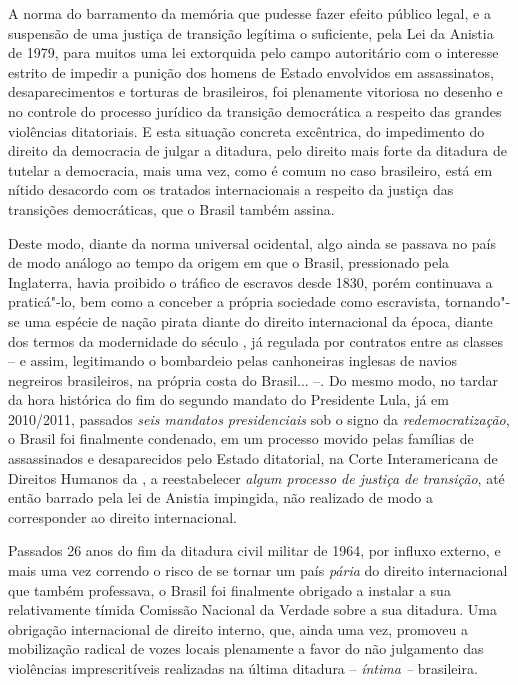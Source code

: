 A norma do barramento da memória que pudesse fazer efeito público legal,
e a suspensão de uma justiça de transição legítima o suficiente, pela
Lei da Anistia de 1979, para muitos uma lei extorquida pelo campo
autoritário com o interesse estrito de impedir a punição dos homens de
Estado envolvidos em assassinatos, desaparecimentos e torturas de
brasileiros, foi plenamente vitoriosa no desenho e no controle do
processo jurídico da transição democrática a respeito das grandes
violências ditatoriais. E esta situação concreta excêntrica, do
impedimento do direito da democracia de julgar a ditadura, pelo direito
mais forte da ditadura de tutelar a democracia, mais uma vez, como é
comum no caso brasileiro, está em nítido desacordo com os tratados
internacionais a respeito da justiça das transições democráticas, que o
Brasil também assina.

Deste modo, diante da norma universal ocidental, algo ainda se passava
no país de modo análogo ao tempo da origem em que o Brasil, pressionado
pela Inglaterra, havia proibido o tráfico de escravos desde 1830, porém
continuava a praticá"-lo, bem como a conceber a própria sociedade como
escravista, tornando"-se uma espécie de nação pirata diante do direito
internacional da época, diante dos termos da modernidade do século ,
já regulada por contratos entre as classes -- e assim, legitimando o
bombardeio pelas canhoneiras inglesas de navios negreiros brasileiros,
na própria costa do Brasil... --. Do mesmo modo, no tardar da hora
histórica do fim do segundo mandato do Presidente Lula, já em 2010/2011,
passados \emph{seis mandatos presidenciais} sob o signo da
\emph{redemocratização}, o Brasil foi finalmente condenado, em um
processo movido pelas famílias de assassinados e desaparecidos pelo
Estado ditatorial, na Corte Interamericana de Direitos Humanos da , a
reestabelecer \emph{algum processo de justiça de transição}, até então
barrado pela lei de Anistia impingida, não realizado de modo a
corresponder ao direito internacional.

Passados 26 anos do fim da ditadura civil militar de 1964, por influxo
externo, e mais uma vez correndo o risco de se tornar um país
\emph{pária} do direito internacional que também professava, o Brasil
foi finalmente obrigado a instalar a sua relativamente tímida Comissão
Nacional da Verdade sobre a sua ditadura. Uma obrigação internacional de
direito interno, que, ainda uma vez, promoveu a mobilização radical de
vozes locais plenamente a favor do não julgamento das violências
imprescritíveis realizadas na última ditadura -- \emph{íntima --}
brasileira.

